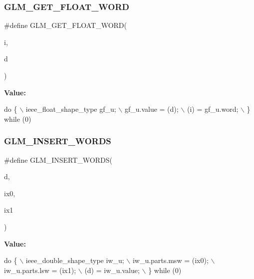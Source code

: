 \subsubsection{\texorpdfstring{G\+L\+M\+\_\+\+G\+E\+T\+\_\+\+F\+L\+O\+A\+T\+\_\+\+W\+O\+RD}{GLM\_GET\_FLOAT\_WORD}}
{\footnotesize\ttfamily \#define G\+L\+M\+\_\+\+G\+E\+T\+\_\+\+F\+L\+O\+A\+T\+\_\+\+W\+O\+RD(\begin{DoxyParamCaption}\item[{}]{i,  }\item[{}]{d }\end{DoxyParamCaption})}

{\bfseries Value\+:}
\begin{DoxyCode}
\textcolor{keywordflow}{do} \{                                    \(\backslash\)
        ieee\_float\_shape\_type gf\_u;         \(\backslash\)
        gf\_u.value = (d);                   \(\backslash\)
        (i) = gf\_u.word;                    \(\backslash\)
    \} \textcolor{keywordflow}{while} (0)
\end{DoxyCode}
\mbox{\label{ulp_8inl_ac4ec14cb5c94f0ca1d594457ee17636f}} 
\subsubsection{\texorpdfstring{G\+L\+M\+\_\+\+I\+N\+S\+E\+R\+T\+\_\+\+W\+O\+R\+DS}{GLM\_INSERT\_WORDS}}
{\footnotesize\ttfamily \#define G\+L\+M\+\_\+\+I\+N\+S\+E\+R\+T\+\_\+\+W\+O\+R\+DS(\begin{DoxyParamCaption}\item[{}]{d,  }\item[{}]{ix0,  }\item[{}]{ix1 }\end{DoxyParamCaption})}

{\bfseries Value\+:}
\begin{DoxyCode}
\textcolor{keywordflow}{do} \{                                    \(\backslash\)
        ieee\_double\_shape\_type iw\_u;        \(\backslash\)
        iw\_u.parts.msw = (ix0);             \(\backslash\)
        iw\_u.parts.lsw = (ix1);             \(\backslash\)
        (d) = iw\_u.value;                   \(\backslash\)
    \} \textcolor{keywordflow}{while} (0)
\end{DoxyCode}
\mbox{\label{ulp_8inl_ab01ab8df0632f4a5f05e00f570e6b873}} 
